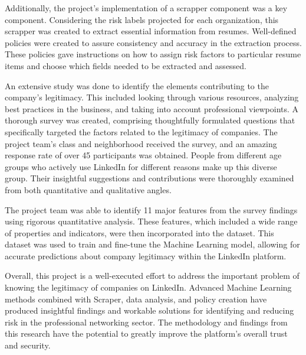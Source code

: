 \documentclass{article}
\begin{document}
Additionally, the project's implementation of a scrapper component was a key component. Considering the risk labels projected for each organization, this scrapper was created to extract essential information from resumes. Well-defined policies were created to assure consistency and accuracy in the extraction process. These policies gave instructions on how to assign risk factors to particular resume items and choose which fields needed to be extracted and assessed.

An extensive study was done to identify the elements contributing to the company's legitimacy. This included looking through various resources, analyzing best practices in the business, and taking into account professional viewpoints.  A thorough survey was created, comprising thoughtfully formulated questions that specifically targeted the factors related to the legitimacy of companies. The project team's class and neighborhood received the survey, and an amazing response rate of over 45 participants was obtained. People from different  age groups who actively use LinkedIn for different reasons make up this diverse group. Their insightful suggestions and contributions were thoroughly examined from both quantitative and qualitative  angles. 

The project team was able to identify 11 major features from the survey findings using rigorous quantitative analysis. These features, which included a wide range of properties and indicators, were then incorporated into the dataset. This dataset was used to train and fine-tune the Machine Learning model, allowing for accurate predictions about company legitimacy within the LinkedIn platform.

Overall, this project is a well-executed effort to address the important problem of knowing the legitimacy of companies on LinkedIn. Advanced Machine Learning methods combined with Scraper, data analysis, and policy creation have produced insightful findings and workable solutions for identifying and reducing risk in the professional networking sector. The methodology and findings from this research have the potential to greatly improve the platform's overall trust and security.
\end{document}
